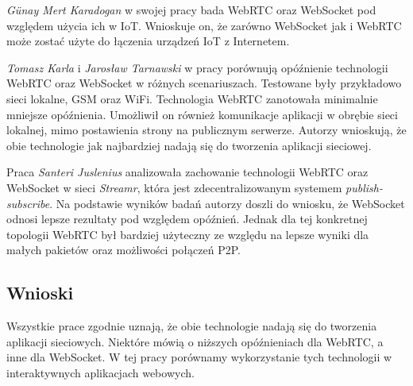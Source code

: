 \documentclass[language=polish,type=master]{aghmodern}
\begin{document}
\emph{G{\"u}nay Mert Karadogan} w swojej pracy \cite{websocket_webrtc_iot} bada WebRTC oraz WebSocket pod względem użycia ich w IoT\footnotemark{}.
Wnioskuje on, że zarówno WebSocket jak i WebRTC może zostać użyte do łączenia urządzeń IoT z Internetem.

\emph{Tomasz Karla} i \emph{Jarosław Tarnawski} w pracy \cite{websocket_webrtc_realtime} porównują opóźnienie technologii WebRTC oraz WebSocket w różnych scenariuszach.
Testowane były przykładowo sieci lokalne, GSM oraz WiFi. Technologia WebRTC zanotowała minimalnie mniejsze opóźnienia.
Umożliwił on również komunikacje aplikacji w obrębie sieci lokalnej\footnotemark{}, mimo postawienia strony na publicznym serwerze.
Autorzy wnioskują, że obie technologie jak najbardziej nadają się do tworzenia aplikacji sieciowej.

Praca \cite{websocket_webrtc_streamr} \emph{Santeri Juslenius} analizowała zachowanie technologii WebRTC oraz WebSocket w sieci \emph{Streamr}, która jest zdecentralizowanym systemem \emph{publish-subscribe}\footnotemark{}.
Na podstawie wyników badań autorzy doszli do wniosku, że WebSocket odnosi lepsze rezultaty pod względem opóźnień.
Jednak dla tej konkretnej topologii WebRTC był bardziej użyteczny ze względu na lepsze wyniki dla małych pakietów oraz możliwości połączeń P2P.

\subsection{Wnioski}
Wszystkie prace zgodnie uznają, że obie technologie nadają się do tworzenia aplikacji sieciowych.
Niektóre mówią o niższych opóźnieniach dla WebRTC, a inne dla WebSocket.
W tej pracy porównamy wykorzystanie tych technologii w interaktywnych aplikacjach webowych.
\end{document}
